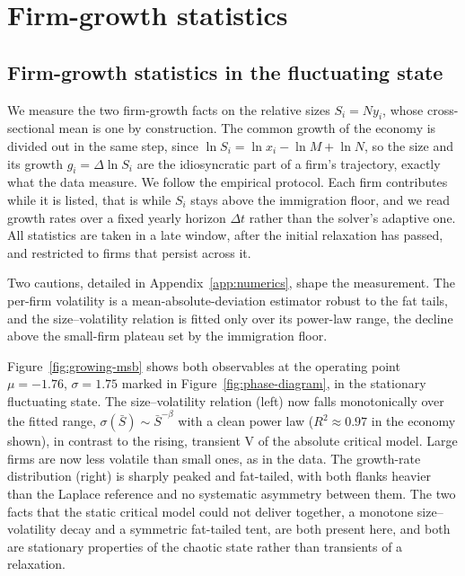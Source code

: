 \chapter{Firm-growth statistics}
\label{chap:firmgrowth}

\section{Firm-growth statistics in the fluctuating state}
\label{sec:growing-observables}

We measure the two firm-growth facts on the relative sizes $S_i = N y_i$, whose
cross-sectional mean is one by construction. The common growth of the economy is divided
out in the same step, since $\ln S_i = \ln x_i - \ln M + \ln N$, so the size and its
growth $g_i = \Delta \ln S_i$ are the idiosyncratic part of a firm's trajectory, exactly
what the data measure. We follow the empirical protocol. Each firm contributes while it
is listed, that is while $S_i$ stays above the immigration floor, and we read growth
rates over a fixed yearly horizon $\Delta t$ rather than the solver's adaptive one. All
statistics are taken in a late window, after the initial relaxation has passed, and
restricted to firms that persist across it.

Two cautions, detailed in Appendix~\ref{app:numerics}, shape the measurement. The
per-firm volatility is a mean-absolute-deviation estimator robust to the fat tails, and
the size--volatility relation is fitted only over its power-law range, the decline above
the small-firm plateau set by the immigration floor.

Figure~\ref{fig:growing-msb} shows both observables at the operating point
$\mu = -1.76$, $\sigma = 1.75$ marked in Figure~\ref{fig:phase-diagram}, in the
stationary fluctuating state. The size--volatility relation (left) now falls
monotonically over the fitted range, $\sigma(\bar S) \sim \bar S^{-\beta}$ with a clean
power law ($R^2 \approx 0.97$ in the economy shown), in contrast to the rising, transient
V of the absolute critical model. Large firms are now less volatile than small ones, as in the
data. The growth-rate distribution (right) is
sharply peaked and fat-tailed, with both flanks heavier than the Laplace reference and
no systematic asymmetry between them. The two facts that the static critical model could
not deliver together, a monotone size--volatility decay and a symmetric fat-tailed tent,
are both present here, and both are stationary properties of the chaotic state rather
than transients of a relaxation.

